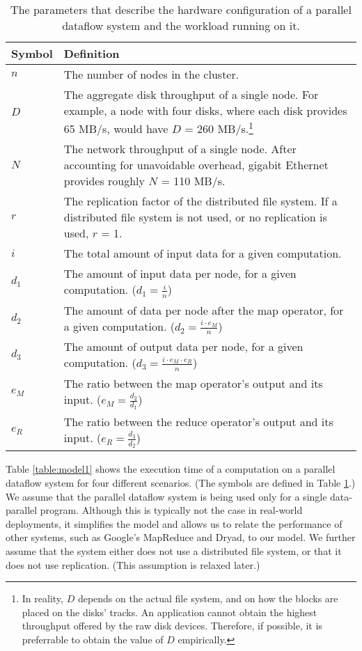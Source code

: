 \documentclass{acm_proc_article-sp}
\begin{document}
\begin{table}
\centering
\begin{minipage}{0.5\textwidth}
\centering
\renewcommand{\arraystretch}{1.2}
\begin{tabular}{|l|p{6.5cm}|}
\hline
Symbol & Definition \\ \hline
$n$    & The number of nodes in the cluster. \\ \hline
$D$    & The aggregate disk throughput of a single node. For example,
a node with four disks, where each disk provides 65 MB/s, would have $D$ = 260
MB/s.\footnote{In reality, $D$ depends on the actual file system, and on
how the blocks are placed on the disks' tracks. An application cannot obtain
the highest throughput offered by the raw disk devices. Therefore, if possible,
it is preferrable to obtain the value of $D$ empirically.} \\ \hline
$N$    & The network throughput of a single node. After accounting for unavoidable overhead, gigabit Ethernet provides roughly $N$ = 110 MB/s. \\ \hline
$r$    & The replication factor of the distributed file system. If a
distributed file system is not used, or no replication is used, $r$ = 1. \\
\hline
$i$    & The total amount of input data for a given computation. \\ \hline
$d_1$  & The amount of input data per node, for a given computation. ($d_1 =
\frac{i}{n}$) \\ \hline
$d_2$  & The amount of data per node after the map operator, for a given
computation. ($d_2 = \frac{i \cdot e_M}{n}$) \\ \hline
$d_3$  & The amount of output data per node, for a given computation. ($d_3 =
\frac{i \cdot e_M \cdot e_R}{n}$) \\ \hline
$e_M$  & The ratio between the map operator's output and its input. ($e_M =
\frac{d_2}{d_1}$) \\ \hline $e_R$  & The ratio between the
reduce operator's output and its input. ($e_R = \frac{d_3}{d_2}$) \\ \hline

\end{tabular}
\caption{The parameters that describe the hardware configuration of a parallel dataflow system and the workload running on it.}
\label{table:symbols}
\end{minipage}
\end{table}

Table \ref{table:model1} shows the execution time of a computation on a
parallel dataflow system for four different scenarios. (The symbols are defined
in Table \ref{table:symbols}.) We assume that the parallel dataflow system is
being used only for a single data-parallel program. Although this is typically
not the case in real-world deployments, it simplifies the model and allows us
to relate the performance of other systems, such as Google's MapReduce and
Dryad, to our model. We further assume that the system either does not
use a distributed file system, or that it does not use replication. (This
assumption is relaxed later.)
\end{document}
